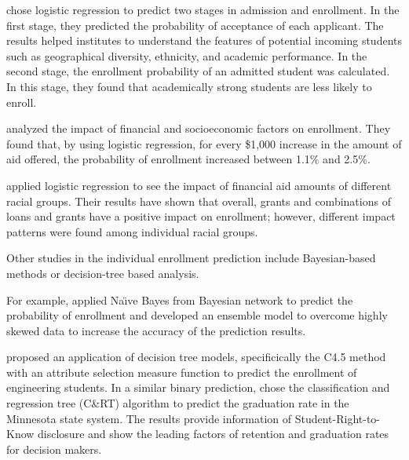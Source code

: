 \documentclass[12pt,english]{report}
\begin{document}
\citet{lr_2} chose logistic regression to predict two stages in admission and enrollment. In the first stage, they predicted the probability of acceptance of each applicant. The results helped institutes to understand the features of potential incoming students such as geographical diversity, ethnicity, and academic  performance. In the second stage, the enrollment probability of an admitted  student was calculated. In this stage, they found that academically strong students are less likely to enroll.

\citet{Braunstein1999} analyzed the impact of financial and socioeconomic factors on  enrollment. They found that, by using logistic regression, for every \$1,000 increase  in the amount of aid offered, the probability of enrollment increased between 1.1\% and  2.5\%.

\citet{lr_aid2} applied logistic regression to see the impact of financial aid amounts  of different racial groups. Their results have shown that overall, grants and  combinations of loans and grants have a positive impact on enrollment;  however, different impact patterns were  found among individual racial groups.



Other studies in the individual enrollment prediction include Bayesian-based methods or decision-tree based analysis.  

For example, \citet{Thanh2007} applied Na{\"\i}ve Bayes  from Bayesian network to predict the probability of enrollment and developed  an ensemble model to overcome highly skewed data to increase the accuracy of  the prediction results. 

\citet{dt_enroll_india} proposed an application of decision tree models, specificically the C4.5 method with an attribute selection measure function to predict the enrollment of engineering students. %
In a similar binary prediction, \citet{Bailey2006} chose the classification and regression tree (C\&RT) algorithm to predict the graduation rate in the Minnesota state system. The results provide information of Student-Right-to-Know disclosure and show the leading factors of retention and graduation rates for decision makers.
\end{document}
